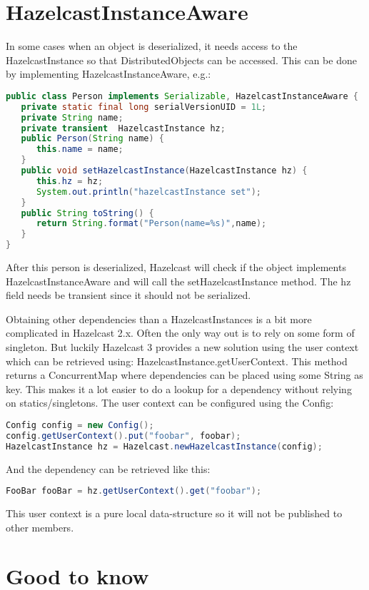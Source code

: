 \section{HazelcastInstanceAware}
In some cases when an object is deserialized, it needs access to the HazelcastInstance so that DistributedObjects can be accessed. This can be done by implementing HazelcastInstanceAware, e.g.:
\begin{lstlisting}[language=java]
public class Person implements Serializable, HazelcastInstanceAware {
   private static final long serialVersionUID = 1L;
   private String name;
   private transient  HazelcastInstance hz;
   public Person(String name) {
      this.name = name;
   }
   public void setHazelcastInstance(HazelcastInstance hz) {
      this.hz = hz;
      System.out.println("hazelcastInstance set");
   }
   public String toString() {
      return String.format("Person(name=%s)",name);
   }
}
\end{lstlisting}
After this person is deserialized, Hazelcast will check if the object implements HazelcastInstanceAware and will call the setHazelcastInstance method. The hz field needs be transient since it should not be serialized. 

Obtaining other dependencies than a HazelcastInstances is a bit more complicated in Hazelcast 2.x. Often the only way out is to rely on some form of singleton. But luckily Hazelcast 3 provides a new solution using the user context which can be retrieved using: HazelcastInstance.getUserContext. This method returns a ConcurrentMap where dependencies can be placed using some String as key. This makes it a lot easier to do a lookup for a dependency without relying on statics/singletons. The user context can be configured using the Config:
\begin{lstlisting}[language=java]
Config config = new Config();
config.getUserContext().put("foobar", foobar);
HazelcastInstance hz = Hazelcast.newHazelcastInstance(config);
\end{lstlisting}
And the dependency can be retrieved like this:
\begin{lstlisting}[language=java]
FooBar fooBar = hz.getUserContext().get("foobar");
\end{lstlisting}
This user context is a pure local data-structure so it will not be published to other members.

\section{Good to know}

